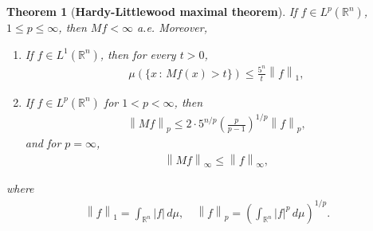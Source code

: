 \documentclass[11pt]{book}
\newtheorem{theorem}{Theorem}[chapter]
\theoremstyle{definition}
\numberwithin{equation}{chapter}
\begin{document}
\medskip

\begin{theorem}[{\bf Hardy-Littlewood maximal theorem}]\label{theorem_65}
If $f \in L^p(\mathbb{R}^n)$, $1 \leq p \leq \infty$, then $Mf < \infty$ a.e. Moreover, 
\begin{enumerate}[label=(\alph*)]
    \item If $f \in L^1(\mathbb{R}^n)$, then for every $t > 0$,
    \begin{align}\label{theorem_65_equ1}
        \mu(\{x \,:\, Mf(x) > t\}) \leq \frac{5^n}{t} \left\|f\right\|_1,
    \end{align}\label{theorem_65_a}
    
    \item If $f \in L^p(\mathbb{R}^n)$ for $1 < p < \infty$, then 
    \begin{align}\label{theorem_65_equ2}
        \left\|Mf\right\|_p \leq 2 \cdot 5^{n/p} \left(\frac{p}{p-1}\right)^{1/p} \left\|f\right\|_p,
    \end{align}
    and for $p = \infty$,
    \begin{align}\label{theorem_65_equ3}
        \left\|Mf\right\|_\infty \leq \left\|f\right\|_\infty,
    \end{align}
\end{enumerate}
where 
\begin{align*}
    \left\|f\right\|_1 = \int_{\mathbb{R}^n} \left|f\right| \,d\mu, \quad \left\|f\right\|_p = \left(\int_{\mathbb{R}^n} \left|f\right|^p \,d\mu\right)^{1/p}.
\end{align*}
\end{theorem}

\medskip
\end{document}

